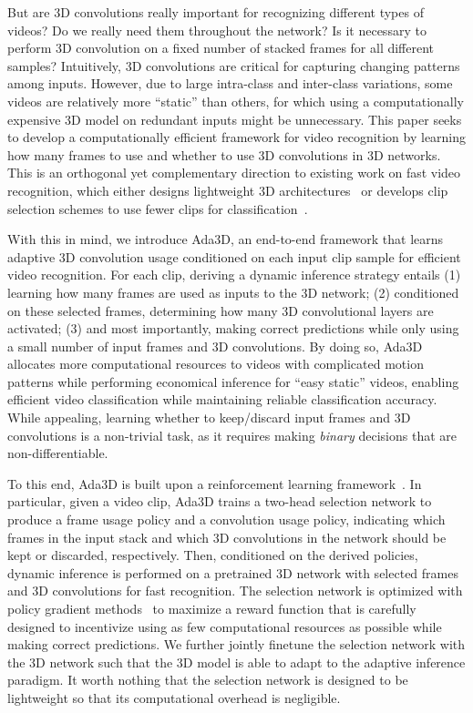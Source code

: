 \documentclass[final]{cvpr}
\newcommand{\system}{{Ada3D}\xspace}
\begin{document}
But are 3D convolutions really important for recognizing different types of videos? Do we really need them throughout the network? Is it necessary to perform 3D convolution on a fixed number of stacked frames for all different samples? Intuitively, 3D convolutions are critical for capturing changing patterns among inputs. However, due to large intra-class and inter-class variations, some videos are relatively more ``static'' than others, for which using a computationally expensive 3D model on redundant inputs might be unnecessary. This paper seeks to develop a computationally efficient framework for video recognition by learning how many frames to use and whether to use 3D convolutions in 3D networks. This is an orthogonal yet complementary direction to existing work on fast video recognition, which either designs lightweight 3D architectures~\cite{r21d,s3d,x3d,channelseparated} or develops clip selection schemes to use fewer clips for classification~\cite{adaframe,scsampler,listentolook,marl,dsn}. 


With this in mind, we introduce \system, an end-to-end framework that learns adaptive 3D convolution usage conditioned on each input clip sample for efficient video recognition. For each clip, deriving a dynamic inference strategy entails (1) learning how many frames are used as inputs to the 3D network; (2) conditioned on these selected frames, determining how many 3D convolutional layers are activated; (3) and most importantly, making correct predictions while only using a small number of input frames and 3D convolutions. By doing so, \system allocates more computational resources to videos with complicated motion patterns while performing economical inference for ``easy static'' videos, enabling efficient video classification while maintaining reliable classification accuracy. While appealing, learning whether to keep/discard input frames and 3D convolutions is a non-trivial task, as it requires making \emph{binary} decisions that are non-differentiable. 

To this end, \system is built upon a reinforcement learning framework~\cite{policygradient}. In particular, given a video clip, \system trains a two-head selection network to produce a frame usage policy and a convolution usage policy, indicating which frames in the input stack and which 3D convolutions in the network should be kept or discarded, respectively. Then, conditioned on the derived policies, dynamic inference is performed on a pretrained 3D network with selected frames and 3D convolutions for fast recognition. The selection network is optimized with policy gradient methods~\cite{policygradient} to maximize a reward function that is carefully designed to incentivize using as few computational resources as possible while making correct predictions. We further jointly finetune the selection network with the 3D network such that the 3D model is able to adapt to the adaptive inference paradigm. It worth nothing that the selection network is designed to be lightweight so that its computational overhead is negligible. 
\end{document}
